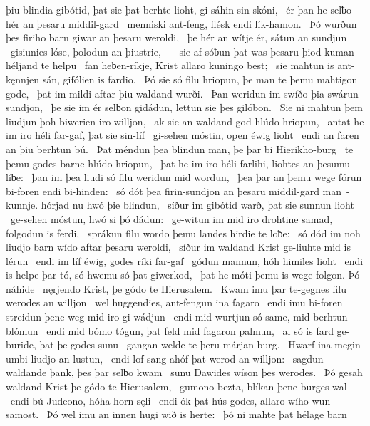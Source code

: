 þiu blindia gibótid, þat sie þat berhte lioht,
gi-sáhin sin-skóni, \hld\ ér þan he selƀo hér
an þesaru middil-gard \hld\ menniski ant-feng,
flésk endi lík-hamon. \hld\ Þó wurðun þes firiho barn
giwar an þesaru weroldi, \hld\ þe hér an wítje ér,
sátun an sundjun \hld\ gisiunies lóse,
þolodun an þiustrie, \hld\ —sie af-sóƀun þat was þesaru þiod kuman
héljand te helpu \hld\ fan heƀen-ríkje,
Krist allaro kuningo best; \hld\ sie mahtun is ant-kęnnjen sán,
gifólien is fardio. \hld\ Þó sie só filu hriopun,
þe man te þemu mahtigon gode, \hld\ þat im mildi aftar þiu
waldand wurði. \hld\ Þan weridun im swíðo
þia swárun sundjon, \hld\ þe sie im ér selƀon gidádun,
lettun sie þes gilóbon. \hld\ Sie ni mahtun þem liudjun þoh
biwerien iro willjon, \hld\ ak sie an waldand god
hlúdo hriopun, \hld\ antat he im iro héli far-gaf,
þat sie sin-líf \hld\ gi-sehen móstin,
open éwig lioht \hld\ endi an faren
an þiu berhtun bú. \hld\ Þat méndun þea blindun man,
þe þar bi Hierikho-burg \hld\ te þemu godes barne
hlúdo hriopun, \hld\ þat he im iro héli farlihi,
liohtes an þesumu líƀe: \hld\ þan im þea liudi só filu
weridun mid wordun, \hld\ þea þar an þemu wege fórun
bi-foren endi bi-hinden: \hld\ só dót þea firin-sundjon
an þesaru middil-gard man\hld\ -kunnje.
hórjad nu hwó þie blindun, \hld\ síður im gibótid warð,
þat sie sunnun lioht \hld\ ge-sehen móstun,
hwó si þó dádun: \hld\ ge-witun im mid iro drohtine samad,
folgodun is ferdi, \hld\ sprákun filu wordo
þemu landes hirdie te loƀe: \hld\ só dód im noh liudjo barn
wído aftar þesaru weroldi, \hld\ síður im waldand Krist
ge-liuhte mid is lérun \hld\ endi im líf éwig,
godes ríki far-gaf \hld\ gódun mannun,
hóh himiles lioht \hld\ endi is helpe þar tó,
só hwemu só þat giwerkod, \hld\ þat he móti þemu is wege folgon.
Þó náhide \hld\ nęrjendo Krist,
þe gódo te Hierusalem. \hld\ Kwam imu þar te-gegnes filu
werodes an willjon \hld\ wel huggendies,
ant-fengun ina fagaro \hld\ endi imu bi-foren streidun
þene weg mid iro gi-wádjun \hld\ endi mid wurtjun só same,
mid berhtun blómun \hld\ endi mid bómo tógun,
þat feld mid fagaron palmun, \hld\ al só is fard ge-buride,
þat þe godes sunu \hld\ gangan welde
te þeru márjan burg. \hld\ Hwarf ina megin umbi
liudjo an lustun, \hld\ endi lof-sang ahóf
þat werod an willjon: \hld\ sagdun waldande þank,
þes þar selƀo kwam \hld\ sunu Dawides
wíson þes werodes. \hld\ Þó gesah waldand Krist
þe gódo te Hierusalem, \hld\ gumono bezta,
blíkan þene burges wal \hld\ endi bú Judeono,
hóha horn-sęli \hld\ endi ók þat hús godes,
allaro wího wun-samost. \hld\ Þó wel imu an innen
hugi wið is herte: \hld\ þó ni mahte þat hélage barn
